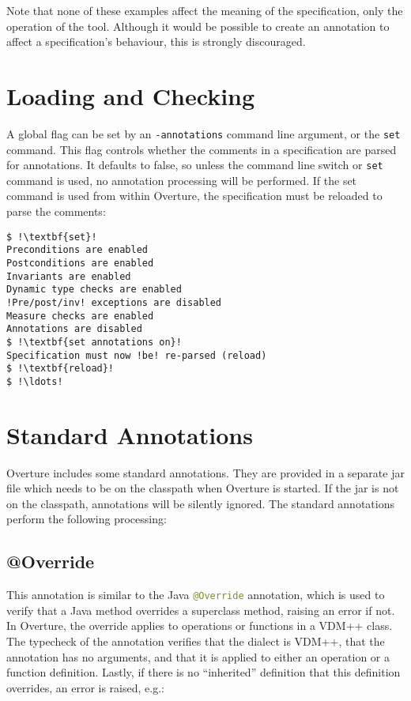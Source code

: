 Note that none of these examples affect the meaning of the
specification, only the operation of the tool. Although it would be
possible to create an annotation to affect a specification's
behaviour, this is strongly discouraged.

\section{Loading and Checking}

A global flag can be set by an \texttt{-annotations} command line
argument, or the \texttt{set} command. This flag controls whether the
comments in a specification are parsed for annotations. It defaults to
false, so unless the command line switch or \texttt{set} command is
used, no annotation processing will be performed. If the set command
is used from within Overture, the specification must be reloaded to
parse the comments:

\begin{lstlisting}[style=tool,escapechar=!]
$ !\textbf{set}!
Preconditions are enabled
Postconditions are enabled
Invariants are enabled
Dynamic type checks are enabled
!Pre/post/inv! exceptions are disabled
Measure checks are enabled
Annotations are disabled
$ !\textbf{set annotations on}!
Specification must now !be! re-parsed (reload)
$ !\textbf{reload}!
$ !\ldots!
\end{lstlisting}


\section{Standard Annotations}\label{sec:standard-annotations}

Overture includes some standard annotations. They are provided in a
separate jar file which needs to be on the classpath when Overture is
started. If the jar is not on the classpath, annotations will be
silently ignored. The standard annotations perform the following
processing:

\subsection{@Override}

This annotation is similar to the Java
\lstinline[language=Java]|@Override| annotation, which is used to
verify that a Java method overrides a superclass method, raising an
error if not. In Overture, the override applies to operations or
functions in a VDM++ class. The typecheck of the annotation verifies
that the dialect is VDM++, that the annotation has no arguments, and
that it is applied to either an operation or a function
definition. Lastly, if there is no ``inherited'' definition that this
definition overrides, an error is
raised, e.g.:\\

